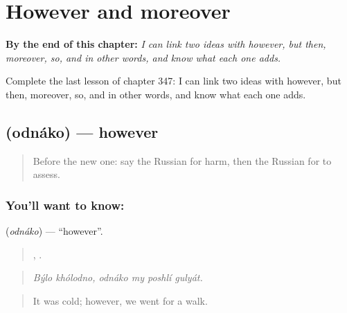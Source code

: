
\chapter{However and moreover}
\label{ch:ru-however-and-moreover}

\begin{chapteropening}
\textbf{By the end of this chapter:} \emph{I can link two ideas with however, but then, moreover, so, and in other words, and know what each one adds.}

Complete the last lesson of chapter 347: I can link two ideas with however, but then, moreover, so, and in other words, and know what each one adds.
\end{chapteropening}

\section[\texorpdfstring{\ru{однако} (odnáko)}{однако (odnáko)}]{ (odnáko) — however}

\label{lesson:RU-C347-odnako}



\begin{quote}
Before the new one: say the Russian for harm, then the Russian for to assess.
\end{quote}

\subsection*{You'll want to know: }
\textbf{} (\emph{odnáko}) — \textquotedblleft{}however\textquotedblright{}.

\begin{quote}
 ,    .
\end{quote}

\begin{quote}
\emph{Býlo khólodno, odnáko my poshlí gulyát.}
\end{quote}

\begin{quote}
It was cold; however, we went for a walk.
\end{quote}

